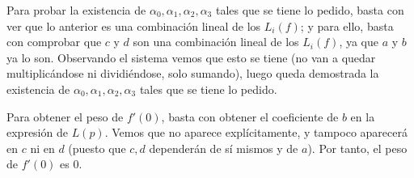 \begin{ejercicio}
    Para probar la existencia de $\alpha_0, \alpha_1, \alpha_2, \alpha_3$ tales que se tiene lo pedido, basta con ver que lo anterior es una combinación lineal de los $L_i(f)$; y para ello, basta con comprobar que $c$ y $d$ son una combinación lineal de los $L_i(f)$, ya que $a$ y $b$ ya lo son. Observando el sistema vemos que esto se tiene (no van a quedar multiplicándose ni dividiéndose, solo sumando), luego queda demostrada la existencia de $\alpha_0, \alpha_1, \alpha_2, \alpha_3$ tales que se tiene lo pedido.

    Para obtener el peso de $f'(0)$, basta con obtener el coeficiente de $b$ en la expresión de $L(p)$. Vemos que no aparece explícitamente, y tampoco aparecerá en $c$ ni en $d$ (puesto que $c,d$ dependerán de sí mismos y de $a$). Por tanto, el peso de $f'(0)$ es $0$.
\end{ejercicio}

